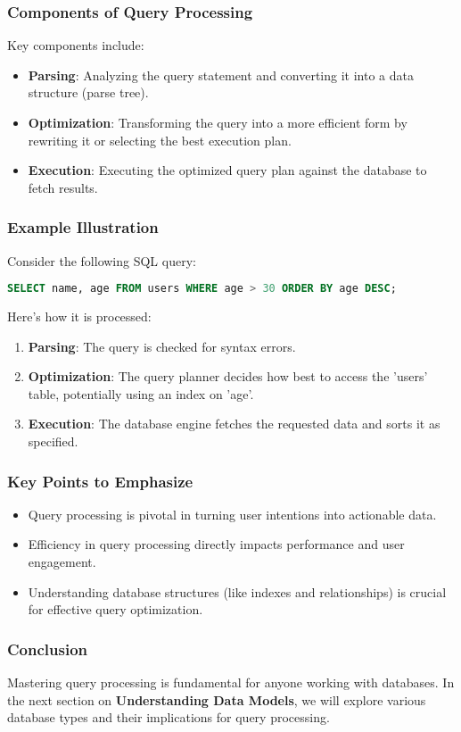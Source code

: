 \documentclass[aspectratio=169]{beamer}
\begin{document}
\begin{frame}[fragile]
  \frametitle{Components of Query Processing}
  Key components include:
  \begin{itemize}
    \item \textbf{Parsing}: Analyzing the query statement and converting it into a data structure (parse tree).
    \item \textbf{Optimization}: Transforming the query into a more efficient form by rewriting it or selecting the best execution plan.
    \item \textbf{Execution}: Executing the optimized query plan against the database to fetch results.
  \end{itemize}
\end{frame}

\begin{frame}[fragile]
  \frametitle{Example Illustration}
  Consider the following SQL query:
  \begin{lstlisting}[language=SQL]
SELECT name, age FROM users WHERE age > 30 ORDER BY age DESC;
  \end{lstlisting}
  
  Here’s how it is processed:
  \begin{enumerate}
    \item \textbf{Parsing}: The query is checked for syntax errors.
    \item \textbf{Optimization}: The query planner decides how best to access the 'users' table, potentially using an index on 'age'.
    \item \textbf{Execution}: The database engine fetches the requested data and sorts it as specified.
  \end{enumerate}
\end{frame}

\begin{frame}[fragile]
  \frametitle{Key Points to Emphasize}
  \begin{itemize}
    \item Query processing is pivotal in turning user intentions into actionable data.
    \item Efficiency in query processing directly impacts performance and user engagement.
    \item Understanding database structures (like indexes and relationships) is crucial for effective query optimization.
  \end{itemize}
\end{frame}

\begin{frame}[fragile]
  \frametitle{Conclusion}
  Mastering query processing is fundamental for anyone working with databases. 
  In the next section on \textbf{Understanding Data Models}, we will explore various database types and their implications for query processing.
\end{frame}
\end{document}
